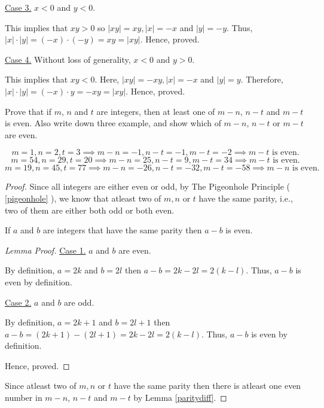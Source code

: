 	\underline{Case 3.} $x < 0$ and $y < 0$.

	This implies that $xy > 0$ so $|xy| = xy, |x| = -x$ and $|y| = -y$. 
	Thus, $|x|\cdot|y| = (-x) \cdot (-y) = xy = |xy|$. Hence, proved.

	\underline{Case 4.} Without loss of generality, $x < 0$ and $y > 0$.

	This implies that $xy < 0$. Here, $|xy| = -xy, |x| = -x$ and $|y| = y$.
	Therefore, $|x| \cdot |y| = (-x) \cdot y = -xy = |xy|$.
	Hence, proved.
\es

\bp 
	Prove that if $m$, $n$ and $t$ are integers, then at least one of $m-n$, $n-t$ and $m-t$ is even. Also write down three example, and show which of $m-n$, $n-t$ or $m-t$ are even.
\ep 

\begin{scratch}
	$$m = 1, n = 2, t = 3 \implies m-n = -1, n-t = -1, m-t = -2 \implies m-t \text { is even.}$$
	$$m = 54, n = 29, t = 20 \implies m-n = 25, n-t = 9, m-t = 34 \implies m-t \text { is even.}$$
	$$m = 19, n = 45, t = 77 \implies m-n = -26, n-t = -32, m-t = -58 \implies m-n \text { is even.}$$
\end{scratch}

\begin{proof}
	Since all integers are either even or odd, by The Pigeonhole Principle ( \ref{pigeonhole} ), we know that atleast two of $m, n$ or $t$ have the same parity, i.e., two of them are either both odd or both even.

	\begin{lemma} \label{paritydiff}
		If $a$ and $b$ are integers that have the same parity then $a-b$ is even.
	\end{lemma}
	\begin{proof}[Lemma Proof]
		\underline{Case 1.} $a$ and $b$ are even.

		By definition, $a = 2k$ and $b = 2l$ then $a-b = 2k-2l = 2(k-l)$. Thus, $a-b$ is even by definition.

		\underline{Case 2.} $a$ and $b$ are odd.

		By definition, $a = 2k+1$ and $b = 2l+1$ then $a-b = (2k+1)-(2l+1) = 2k-2l = 2(k-l)$. Thus, $a-b$ is even by definition.

		Hence, proved.
	\end{proof}

	Since atleast two of $m, n$ or $t$ have the same parity then there is atleast one even number in $m-n$, $n-t$ and $m-t$ by Lemma \ref{paritydiff}.
\end{proof}


